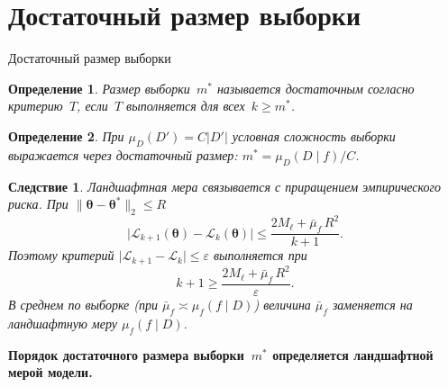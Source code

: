 \documentclass[9pt,pdf,hyperref={unicode}]{beamer}
\newtheorem{rusdefinition}{Определение}
\newtheorem{ruscorollary}{Следствие}
\newcommand{\key}[1]{\par\vspace{0.5ex}\noindent\textbf{\color{darkgreen}#1}}
\begin{document}
\section{Достаточный размер выборки}
\begin{frame}{Достаточный размер выборки}
\justifying
\footnotesize
\begin{rusdefinition}
    Размер выборки~$m^*$ называется достаточным согласно критерию~$T$, если~$T$ выполняется для всех~$k\ge m^*$.
\end{rusdefinition}
\begin{rusdefinition}
    При $\mu_D(D')=C\lvert D'\rvert$ условная сложность выборки выражается через достаточный размер: $m^*=\mu_D(D\mid f)/C$.
\end{rusdefinition}
\begin{ruscorollary}
    Ландшафтная мера связывается с приращением эмпирического риска. При $\|\boldsymbol{\theta}-\boldsymbol{\theta}^*\|_2\le R$
    \[
        \bigl|\mathcal{L}_{k+1}(\boldsymbol{\theta})-\mathcal{L}_k(\boldsymbol{\theta})\bigr|
        \le\frac{2M_\ell+\bar\mu_f\,R^2}{k+1}.
    \]
    Поэтому критерий $\bigl|\mathcal{L}_{k+1}-\mathcal{L}_k\bigr|\le\varepsilon$ выполняется при
    \[
        k+1\ge\frac{2M_\ell+\bar\mu_f\,R^2}{\varepsilon}.
    \]
    В среднем по выборке (при $\bar\mu_f\asymp\mu_f(f\mid D)$) величина $\bar\mu_f$ заменяется на ландшафтную меру $\mu_f(f\mid D)$.
\end{ruscorollary}
\key{Порядок достаточного размера выборки~$m^*$ определяется ландшафтной мерой модели.}
\end{frame}
\end{document}
